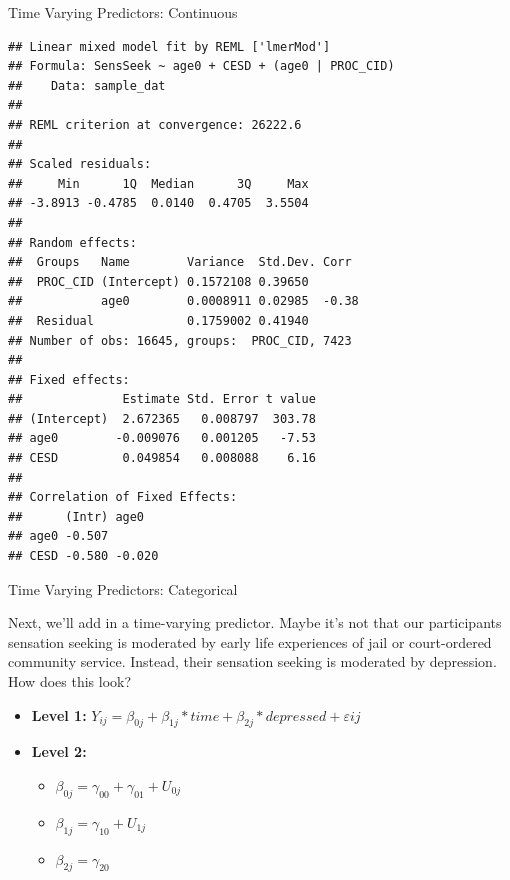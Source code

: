 \begin{frame}[fragile]{Time Varying Predictors: Continuous}

\small

\begin{Shaded}
\begin{Highlighting}[]
\StringTok{ }\OperatorTok{~}\StringTok{ }\OperatorTok{+}\StringTok{ }\OperatorTok{+}\StringTok{ }\OperatorTok{|}
\end{Highlighting}
\end{Shaded}

\tiny

\begin{verbatim}
## Linear mixed model fit by REML ['lmerMod']
## Formula: SensSeek ~ age0 + CESD + (age0 | PROC_CID)
##    Data: sample_dat
## 
## REML criterion at convergence: 26222.6
## 
## Scaled residuals: 
##     Min      1Q  Median      3Q     Max 
## -3.8913 -0.4785  0.0140  0.4705  3.5504 
## 
## Random effects:
##  Groups   Name        Variance  Std.Dev. Corr 
##  PROC_CID (Intercept) 0.1572108 0.39650       
##           age0        0.0008911 0.02985  -0.38
##  Residual             0.1759002 0.41940       
## Number of obs: 16645, groups:  PROC_CID, 7423
## 
## Fixed effects:
##              Estimate Std. Error t value
## (Intercept)  2.672365   0.008797  303.78
## age0        -0.009076   0.001205   -7.53
## CESD         0.049854   0.008088    6.16
## 
## Correlation of Fixed Effects:
##      (Intr) age0  
## age0 -0.507       
## CESD -0.580 -0.020
\end{verbatim}

\normalsize

\end{frame}

\begin{frame}{Time Varying Predictors: Categorical}

Next, we'll add in a time-varying predictor. Maybe it's not that our
participants sensation seeking is moderated by early life experiences of
jail or court-ordered community service. Instead, their sensation
seeking is moderated by depression.\\
How does this look?

\begin{itemize}
  \item \textbf{Level 1:} $Y_{ij} = \beta_{0j} + \beta_{1j}*time + \beta_{2j}*depressed + \varepsilon{ij}$
  \item \textbf{Level 2:} 
    \begin{itemize} 
      \item $\beta_{0j} = \gamma_{00} + \gamma_{01} + U_{0j}$
      \item $\beta_{1j} = \gamma_{10} + U_{1j}$
      \item $\beta_{2j} = \gamma_{20}$
    \end{itemize}
\end{itemize}

\end{frame}

